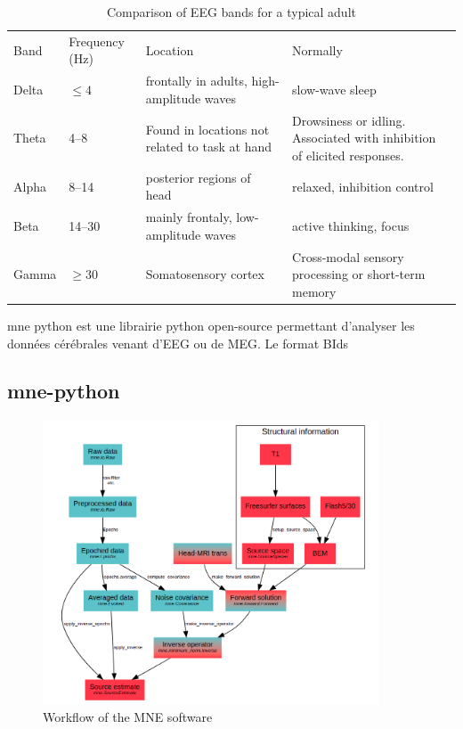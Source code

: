 \begin{table}[ht]
    \caption{Comparison of EEG bands for a typical adult}
    \centering
    \begin{tabular}{@{}| p{1.2cm}|p{2.5cm}| p{4.5cm}|p{4.5cm}| @{}}
        \hline
        Band  & Frequency (Hz) & Location                                       & Normally                                                                \\
        Delta & $\leq  4$      & frontally in adults, high-amplitude waves      & slow-wave sleep                                                         \\
        Theta & 4–8            & Found in locations not related to task at hand & Drowsiness or idling. Associated with inhibition of elicited responses. \\
        Alpha & 8–14           & posterior regions of head                      & relaxed, inhibition control                                             \\
        Beta  & 14–30          & mainly frontaly, low-amplitude waves           & active thinking, focus                                                  \\
        Gamma & $\geq 30$      & Somatosensory cortex                           & Cross-modal sensory processing or short-term memory                     \\
        \hline
    \end{tabular}
    \label{Tab:neural_freq_band}
\end{table}


mne python est une librairie python open-source permettant d'analyser les données cérébrales venant d'EEG ou de MEG. Le format BIds

\subsection{mne-python}


\begin{figure}[ht]
    \centering
    \includegraphics[width=10cm]{images_report/workflow_of_the_mne_software.png}
    \caption{Workflow of the MNE software \cite{GramfortEtAl2013a}}
\end{figure}


